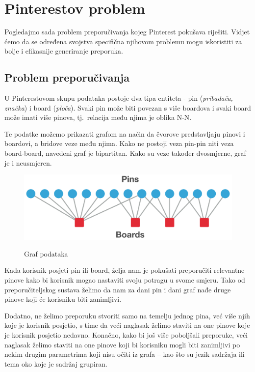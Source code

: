 \documentclass[times, utf8, seminar]{fer}
\begin{document}
\section{Pinterestov problem}

Pogledajmo sada problem preporučivanja kojeg Pinterest pokušava riješiti. Vidjet ćemo da se određena svojstva specifična njihovom problemu mogu iskoristiti za bolje i efikasnije generiranje preporuka.

\subsection{Problem preporučivanja}

U Pinterestovom skupu podataka postoje dva tipa entiteta - pin (\textit{pribadača, značka}) i board (\textit{ploča}). Svaki pin može biti povezan s više boardova i svaki board može imati više pinova, tj.\ relacija među njima je oblika N-N.

Te podatke možemo prikazati grafom na način da čvorove predstavljaju pinovi i boardovi, a bridove veze među njima. Kako ne postoji veza pin-pin niti veza board-board, navedeni graf je bipartitan. Kako su veze također dvosmjerne, graf je i neusmjeren.

\begin{figure}[h]
	\centering
	\includegraphics[width=\textwidth]{pins_boards_graph}
	\caption{Graf podataka}
	\cite{medium-article}
	\label{fig:pins_boards}
\end{figure}

Kada korisnik posjeti pin ili board, želja nam je pokušati preporučiti relevantne pinove kako bi korisnik mogao nastaviti svoju potragu u svome smjeru. Tako od preporučiteljskog sustava želimo da nam za dani pin i dani graf nađe druge pinove koji će korisniku biti zanimljivi.

Dodatno, ne želimo preporuku stvoriti samo na temelju jednog pina, već više njih koje je korisnik posjetio, s time da veći naglasak želimo staviti na one pinove koje je korisnik posjetio nedavno. Konačno, kako bi još više poboljšali preporuke, veći naglasak želimo staviti na one pinove koji bi korisniku mogli biti zanimljivi po nekim drugim parametrima koji nisu očiti iz grafa -- kao što su jezik sadržaja ili tema oko koje je sadržaj grupiran.
\end{document}
